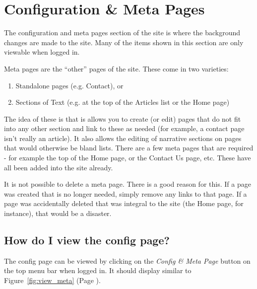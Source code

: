 \documentclass[12pt]{article}
\newcommand{\myref}[1]{\ref{#1} {\scriptsize(Page \pageref{#1})}}
\begin{document}
\newpage
\FloatBarrier
\section{Configuration \& Meta Pages}\label{sec:config}
The configuration and meta pages section of the site is where the background changes are made to the site. Many of the items shown in this section are only viewable when logged in.

Meta pages are the ``other'' pages of the site. These come in two varieties:
\begin{enumerate}
\item Standalone pages (e.g. Contact), or
\item Sections of Text (e.g. at the top of the Articles list or the Home page)
\end{enumerate}

The idea of these is that is allows you to create (or edit) pages that do not fit into any other section and link to these as needed (for example, a contact page isn't really an article). It also allows the editing of narrative sections on pages that would otherwise be bland lists. There are a few meta pages that are required - for example the top of the Home page, or the Contact Us page, etc. These have all been added into the site already.

\begin{infoBox}
It is not possible to delete a meta page. There is a good reason for this. If a page was created that is no longer needed, simply remove any links to that page. If a page was accidentally deleted that was integral to the site (the Home page, for instance), that would be a disaster.
\end{infoBox}

\newpage
\FloatBarrier
\subsection{How do I view the config page?}\label{ssec:config}
The config page can be viewed by clicking on the \textit{Config \& Meta Page} button on the top menu bar when logged in. It should display similar to Figure~\myref{fig:view_meta}.
\end{document}
